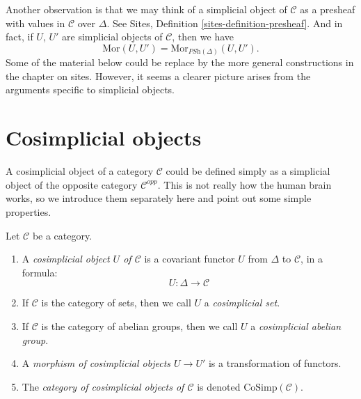\noindent
Another observation is that we may think of a simplicial
object of $\mathcal{C}$ as a presheaf with values in $\mathcal{C}$
over $\Delta$. See
Sites, Definition \ref{sites-definition-presheaf}.
And in fact, if $U$, $U'$ are simplicial objects
of $\mathcal{C}$, then we have
\begin{equation}
\label{simplicial-set-presheaf}
\text{Mor}(U, U') = \text{Mor}_{\textit{PSh}(\Delta)}(U, U').
\end{equation}
Some of the material below could be replace by the more
general constructions in the chapter on sites.
However, it seems a clearer picture arises from the
arguments specific to simplicial objects.
















\section{Cosimplicial objects}
\label{section-cosimplicial-object}

\noindent
A cosimplicial object of a category $\mathcal{C}$ could
be defined simply as a simplicial object of the
opposite category $\mathcal{C}^{opp}$. This is not
really how the human brain works, so we introduce
them separately here and point out some simple
properties.

\begin{definition}
\label{definition-cosimplicial-object}
Let $\mathcal{C}$ be a category.
\begin{enumerate}
\item A {\it cosimplicial object $U$ of $\mathcal{C}$}
is a covariant functor $U$ from $\Delta$ to
$\mathcal{C}$, in a formula:
$$
U : \Delta \longrightarrow \mathcal{C}
$$
\item If $\mathcal{C}$ is the category of sets, then we call
$U$ a {\it cosimplicial set}.
\item If $\mathcal{C}$ is the category of abelian groups,
then we call $U$ a {\it cosimplicial abelian group}.
\item A {\it morphism of cosimplicial objects $U \to U'$}
is a transformation of functors.
\item The {\it category of cosimplicial objects of $\mathcal{C}$}
is denoted $\text{CoSimp}(\mathcal{C})$.
\end{enumerate}
\end{definition}

